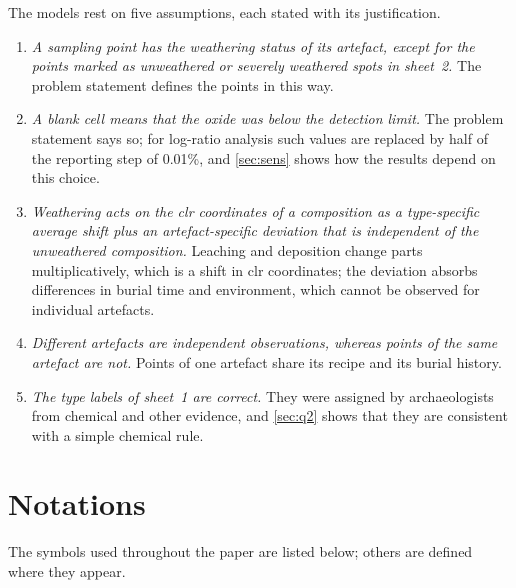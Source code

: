 \documentclass[11pt,a4paper]{article}
\begin{document}
The models rest on five assumptions, each stated with its justification.
\begin{enumerate}[label=A\arabic*.,leftmargin=*,itemsep=4pt]
\item \emph{A sampling point has the weathering status of its artefact, except for the points marked as unweathered or severely weathered spots in sheet~2.} The problem statement defines the points in this way.
\item \emph{A blank cell means that the oxide was below the detection limit.} The problem statement says so; for log-ratio analysis such values are replaced by half of the reporting step of 0.01\%, and \cref{sec:sens} shows how the results depend on this choice.
\item \emph{Weathering acts on the clr coordinates of a composition as a type-specific average shift plus an artefact-specific deviation that is independent of the unweathered composition.} Leaching and deposition change parts multiplicatively, which is a shift in clr coordinates; the deviation absorbs differences in burial time and environment, which cannot be observed for individual artefacts.
\item \emph{Different artefacts are independent observations, whereas points of the same artefact are not.} Points of one artefact share its recipe and its burial history.
\item \emph{The type labels of sheet~1 are correct.} They were assigned by archaeologists from chemical and other evidence, and \cref{sec:q2} shows that they are consistent with a simple chemical rule.
\end{enumerate}

\section{Notations}\label{sec:notation}

The symbols used throughout the paper are listed below; others are defined where they appear.
\end{document}
